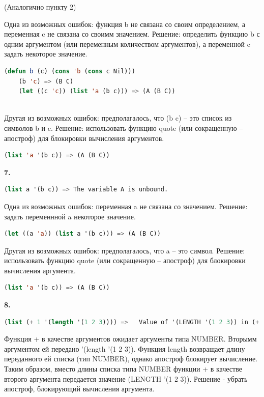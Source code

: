 \documentclass[12pt]{report}
\begin{document}
(Аналогично пункту 2)

Одна из возможных ошибок: функция b не связана со своим определением, а переменная c не связана со своимм значением. Решение: определить функцию b с одним аргументом (или переменным количеством аргументов), а переменной c задать некоторое значение.
\begin{lstlisting}[language=Lisp]
	(defun b (c) (cons 'b (cons c Nil)))
	(b 'c) => (B C)
	(let ((c 'c)) (list 'a (b c))) => (A (B C))
	
\end{lstlisting}

Другая из возможных ошибок: предполагалось, что (b c) -- это список из символов b и c. Решение: использовать функцию quote (или сокращенную -- апостроф) для блокировки вычисления аргументов.
\begin{lstlisting}[language=Lisp]
	(list 'a '(b c)) => (A (B C))
\end{lstlisting}







\textbf{7.} 
\begin{lstlisting}[language=Lisp]
	(list a '(b c)) => The variable A is unbound.
\end{lstlisting}

Одна из возможных ошибок: переменная a не связана со значением. Решение: задать переменнной a некоторое значение.
\begin{lstlisting}[language=Lisp]
	(let ((a 'a)) (list a '(b c))) => (A (B C))
\end{lstlisting}

Другая из возможных ошибок: предполагалось, что a -- это символ. Решение: использовать функцию quote (или сокращенную -- апостроф) для блокировки вычисления аргумента.
\begin{lstlisting}[language=Lisp]
	(list 'a '(b c)) => (A (B C))
\end{lstlisting}








\textbf{8.} 

\begin{lstlisting}[language=Lisp]
	(list (+ 1 '(length '(1 2 3)))) =>   Value of '(LENGTH '(1 2 3)) in (+ 1 '(LENGTH '(1 2 3))) is (LENGTH '(1 2 3)), not a NUMBER.
\end{lstlisting}

Функция + в качестве аргументов ожидает аргументы типа NUMBER. Вторымм аргументом ей передано '(length '(1 2 3)). Функция length возвращает длину переданного ей списка (тип NUMBER), однако апостроф блокирует вычисление. Таким образом, вместо длины списка типа NUMBER функции + в качестве второго аргумента передается значение (LENGTH '(1 2 3)). Решение - убрать апостроф, блокирующий вычисления аргумента.
\end{document}
